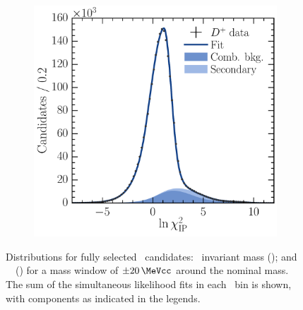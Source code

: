 \begin{figure}
\begin{subfigure}[b]{0.5\textwidth}
    \includegraphics[width=\textwidth]{figures/production/fitting/DpToKpipi_ipchisq_fit_pT_integrated_y_integrated}
    \caption{\lnipchisq}
    \label{fig:prod:fitting:DpToKpipi:ipchisq}
  \end{subfigure}
  \caption{%
    Distributions for fully selected \DpToKpipi\ candidates: \PDplus\ invariant 
    mass (); and \PDplus\ \lnipchisq\ 
    () for a mass window of 
    $\pm\SI{20}{\MeVcc}$ around the nominal \PDplus mass.
    The sum of the simultaneous likelihood fits in each \pTy\ bin is shown, 
    with components as indicated in the legends.
  }
  \label{fig:prod:fitting:DpToKpipi}
\end{figure}

